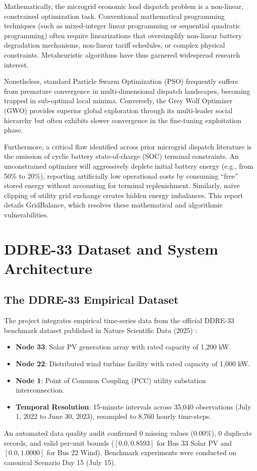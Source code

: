 \documentclass[journal,10pt,twocolumn]{IEEEtran}
\begin{document}
Mathematically, the microgrid economic load dispatch problem is a non-linear, constrained optimization task. Conventional mathematical programming techniques (such as mixed-integer linear programming or sequential quadratic programming) often require linearizations that oversimplify non-linear battery degradation mechanisms, non-linear tariff schedules, or complex physical constraints. Metaheuristic algorithms have thus garnered widespread research interest.

Nonetheless, standard Particle Swarm Optimization (PSO) frequently suffers from premature convergence in multi-dimensional dispatch landscapes, becoming trapped in sub-optimal local minima. Conversely, the Grey Wolf Optimizer (GWO) provides superior global exploration through its multi-leader social hierarchy but often exhibits slower convergence in the fine-tuning exploitation phase.

Furthermore, a critical flaw identified across prior microgrid dispatch literature is the omission of cyclic battery state-of-charge (SOC) terminal constraints. An unconstrained optimizer will aggressively deplete initial battery energy (e.g., from 50\% to 20\%), reporting artificially low operational costs by consuming ``free'' stored energy without accounting for terminal replenishment. Similarly, naive clipping of utility grid exchange creates hidden energy imbalances. This report details GridBalance, which resolves these mathematical and algorithmic vulnerabilities.

\section{DDRE-33 Dataset and System Architecture}

\subsection{The DDRE-33 Empirical Dataset}
The project integrates empirical time-series data from the official DDRE-33 benchmark dataset published in Nature Scientific Data (2025) \cite{chen2025ddre}:
\begin{itemize}
    \item \textbf{Node 33}: Solar PV generation array with rated capacity of 1,200 kW.
    \item \textbf{Node 22}: Distributed wind turbine facility with rated capacity of 1,000 kW.
    \item \textbf{Node 1}: Point of Common Coupling (PCC) utility substation interconnection.
    \item \textbf{Temporal Resolution}: 15-minute intervals across 35,040 observations (July 1, 2022 to June 30, 2023), resampled to 8,760 hourly time-steps.
\end{itemize}
An automated data quality audit confirmed 0 missing values (0.00\%), 0 duplicate records, and valid per-unit bounds ($[0.0, 0.8593]$ for Bus 33 Solar PV and $[0.0, 1.0000]$ for Bus 22 Wind). Benchmark experiments were conducted on canonical Scenario Day 15 (July 15).
\end{document}
